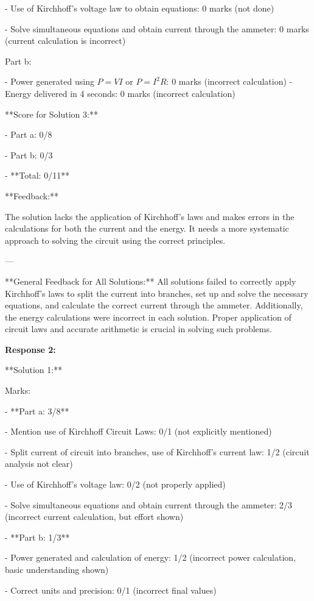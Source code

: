 \documentclass[a4paper,11pt]{article}
\begin{document}
- Use of Kirchhoff’s voltage law to obtain equations: 0 marks (not done)

- Solve simultaneous equations and obtain current through the ammeter: 0 marks (current calculation is incorrect)

Part b:

- Power generated using \( P = VI \) or \( P = I^2 R \): 0 marks (incorrect calculation)
- Energy delivered in 4 seconds: 0 marks (incorrect calculation)

**Score for Solution 3:**

- Part a: 0/8

- Part b: 0/3

- **Total: 0/11**

**Feedback:**

The solution lacks the application of Kirchhoff's laws and makes errors in the calculations for both the current and the energy. It needs a more systematic approach to solving the circuit using the correct principles.

---

**General Feedback for All Solutions:**
All solutions failed to correctly apply Kirchhoff's laws to split the current into branches, set up and solve the necessary equations, and calculate the correct current through the ammeter. Additionally, the energy calculations were incorrect in each solution. Proper application of circuit laws and accurate arithmetic is crucial in solving such problems.

\bigskip
\textbf{Response 2:}

**Solution 1:**

Marks:

- **Part a: 3/8**

  - Mention use of Kirchhoff Circuit Laws: 0/1 (not explicitly mentioned)
  
  - Split current of circuit into branches, use of Kirchhoff’s current law: 1/2 (circuit analysis not clear)
  
  - Use of Kirchhoff’s voltage law: 0/2 (not properly applied)
  
  - Solve simultaneous equations and obtain current through the ammeter: 2/3 (incorrect current calculation, but effort shown)

- **Part b: 1/3**

  - Power generated and calculation of energy: 1/2 (incorrect power calculation, basic understanding shown)
  
  - Correct units and precision: 0/1 (incorrect final values)
\end{document}
